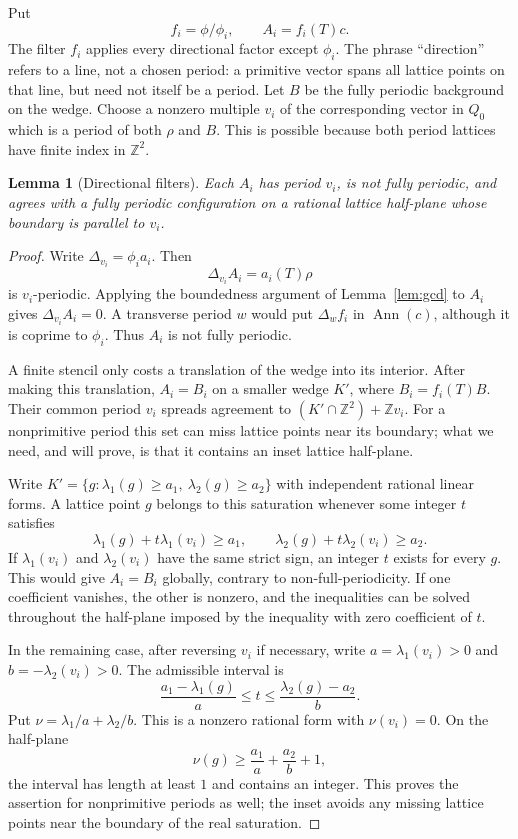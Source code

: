 \documentclass[11pt]{article}
\numberwithin{equation}{section}
\newtheorem{lemma}[theorem]{Lemma}
\theoremstyle{definition}
\theoremstyle{remark}
\newcommand{\Z}{\mathbb Z}
\newcommand{\Ann}{\operatorname{Ann}}
\newcommand{\Del}[1]{\Delta_{#1}}
\begin{document}
Put
\[
 f_i=\phi/\phi_i,\qquad A_i=f_i(T)c.
\]
The filter $f_i$ applies every directional factor except $\phi_i$. The phrase ``direction'' refers
to a line, not a chosen period: a primitive vector spans all lattice points on that line, but need
not itself be a period. Let $B$ be the fully periodic background on the wedge. Choose a nonzero multiple $v_i$ of the corresponding vector in $Q_0$ which
is a period of both $\rho$ and $B$. This is possible because both period lattices have finite index
in $\Z^2$.

\begin{lemma}[Directional filters]\label{lem:filters}
Each $A_i$ has period $v_i$, is not fully periodic, and agrees with a fully periodic configuration
on a rational lattice half-plane whose boundary is parallel to $v_i$.
\end{lemma}
\begin{proof}
Write $\Del{v_i}=\phi_i a_i$. Then
\[
 \Del{v_i}A_i=a_i(T)\rho
\]
is $v_i$-periodic. Applying the boundedness argument of Lemma~\ref{lem:gcd} to $A_i$ gives
$\Del{v_i}A_i=0$. A transverse period $w$ would put $\Del w f_i$ in $\Ann(c)$, although it is
coprime to $\phi_i$. Thus $A_i$ is not fully periodic.

A finite stencil only costs a translation of the wedge into its interior. After making this
translation, $A_i=B_i$ on a smaller wedge $K'$, where $B_i=f_i(T)B$. Their common period $v_i$
spreads agreement to $(K'\cap\Z^2)+\Z v_i$. For a nonprimitive period this set can miss lattice
points near its boundary; what we need, and will prove, is that it contains an inset lattice
half-plane.

Write $K'=\{g:\lambda_1(g)\ge a_1,\ \lambda_2(g)\ge a_2\}$ with independent rational linear forms. A
lattice point $g$ belongs to this saturation whenever some integer $t$ satisfies
\[
 \lambda_1(g)+t\lambda_1(v_i)\ge a_1,\qquad
 \lambda_2(g)+t\lambda_2(v_i)\ge a_2.
\]
If $\lambda_1(v_i)$ and $\lambda_2(v_i)$ have the same strict sign, an integer $t$ exists for every
$g$. This would give $A_i=B_i$ globally, contrary to non-full-periodicity. If one coefficient
vanishes, the other is nonzero, and the inequalities can be solved throughout the half-plane imposed
by the inequality with zero coefficient of $t$.

In the remaining case, after reversing $v_i$ if necessary, write $a=\lambda_1(v_i)>0$ and
$b=-\lambda_2(v_i)>0$. The admissible interval is
\[
 \frac{a_1-\lambda_1(g)}{a}\le t\le
 \frac{\lambda_2(g)-a_2}{b}.
\]
Put $\nu=\lambda_1/a+\lambda_2/b$. This is a nonzero rational form with $\nu(v_i)=0$. On the half-plane
\[
 \nu(g)\ge \frac{a_1}{a}+\frac{a_2}{b}+1,
\]
the interval has length at least $1$ and contains an integer. This proves the assertion for
nonprimitive periods as well; the inset avoids any missing lattice points near the boundary of the
real saturation.
\end{proof}
\end{document}
